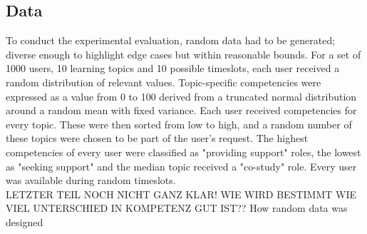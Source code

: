 \documentclass[nochapterpage,bigchapter,linedtoc,longdoc,colorback,accentcolor=tud3b]{tudreport}
\begin{document}
\subsection{Data}
To conduct the experimental evaluation, random data had to be generated; diverse enough to highlight edge cases but within reasonable bounds. For a set of 1000 users, 10 learning topics and 10 possible timeslots, each user received a random distribution of relevant values. Topic-specific competencies were expressed as a value from 0 to 100 derived from a truncated normal distribution around a random mean with fixed variance. Each user received competencies for every topic. These were then sorted from low to high, and a random number of these topics were chosen to be part of the user's request. The highest competencies of every user were classified as "providing support" roles, the lowest as "seeking support" and the median topic received a "co-study" role. Every user was available during random timeslots.\\
LETZTER TEIL NOCH NICHT GANZ KLAR! WIE WIRD BESTIMMT WIE VIEL UNTERSCHIED IN KOMPETENZ GUT IST??
How random data was designed\\
\end{document}
